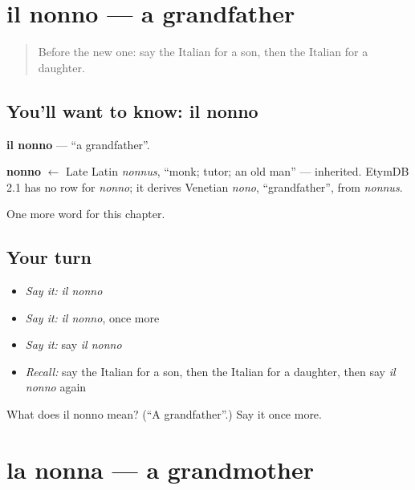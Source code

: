 \section[il nonno]{il nonno — a grandfather}

\label{lesson:IT-C44-nonno}



\begin{quote}
Before the new one: say the Italian for a son, then the Italian for a daughter.
\end{quote}

\subsection*{You'll want to know: il nonno}
\textbf{il nonno} — \textquotedblleft{}a grandfather\textquotedblright{}.

\begin{cousinweb}
\textbf{nonno} $\leftarrow$ Late Latin \emph{nonnus}, \textquotedblleft{}monk; tutor; an old man\textquotedblright{} — inherited. EtymDB 2.1 has no row for \emph{nonno}; it derives Venetian \emph{nono}, \textquotedblleft{}grandfather\textquotedblright{}, from \emph{nonnus}.
\end{cousinweb}

\begin{grammarlens}[title={What you've built}]
One more word for this chapter.
\end{grammarlens}

\subsection*{Your turn}
\begin{itemize}
\raggedright
  \item \emph{Say it:} \emph{il nonno}
  \item \emph{Say it:} \emph{il nonno}, once more
  \item \emph{Say it:} say \emph{il nonno}
  \item \emph{Recall:} say the Italian for a son, then the Italian for a daughter, then say \emph{il nonno} again
\end{itemize}

\begin{tcolorbox}[breakable,colback=teal!4,colframe=teal!35!black,title={Before you move on}]
What does il nonno mean? (\textquotedblleft{}A grandfather\textquotedblright{}.) Say it once more.
\end{tcolorbox}
\section[la nonna]{la nonna — a grandmother}

